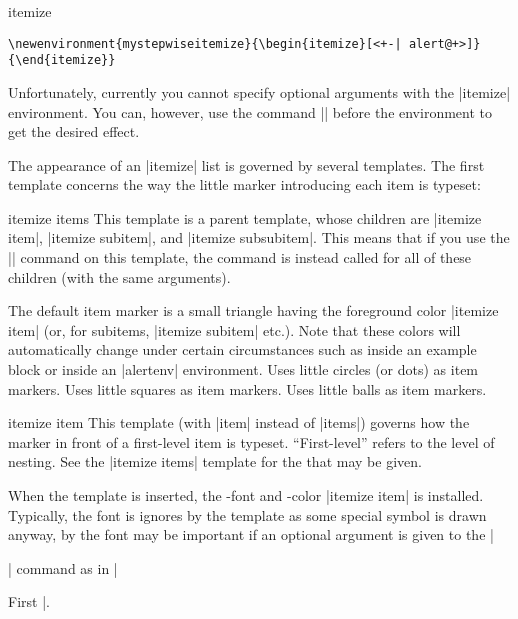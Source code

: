 \begin{environment}{{itemize}}
  \example
\begin{verbatim}
\newenvironment{mystepwiseitemize}{\begin{itemize}[<+-| alert@+>]}{\end{itemize}}
\end{verbatim}

  \lyxnote
  Unfortunately, currently you cannot specify optional arguments with
  the |itemize| environment. You can, however, use the command
  |\beamerdefaultoverlayspecification| before the environment to get
  the desired effect.

  \appearancenote
  The appearance of an |itemize| list is governed by several
  templates. The first template concerns the way the little marker
  introducing each item is typeset:  
  \begin{template}{itemize items}
    This template is a parent template, whose children are
    |itemize item|, |itemize subitem|, and |itemize subsubitem|. This
    means that if you use the |\setbeamertemplate| command on this
    template, the command is instead called for all of these children
    (with the same arguments). 

    \begin{templateoptions}
      The default item marker is a small triangle having the
      foreground color |itemize item| (or, for subitems, |itemize subitem|
      etc.). Note that these colors will automatically change under
      certain circumstances such as inside an example block or inside
      an |alertenv| environment. 
      Uses little circles (or dots) as item markers. 
      Uses little squares as item markers.
      Uses little balls as item markers.
    \end{templateoptions}
  \end{template}

  \begin{template}{itemize item}
    This template (with |item| instead of |items|) governs how the
    marker in front of a first-level item is typeset. ``First-level''
    refers to the level of nesting. See the |itemize items| template
    for the  that may be given.

    When the template is inserted, the \beamer-font and -color
    |itemize item| is installed. Typically, the font is ignores by the
    template as some special symbol is drawn anyway, by the font may
    be important if an optional argument is given to the
    |\item| command as in |\item[First]|.
  \end{template}


\end{environment}
